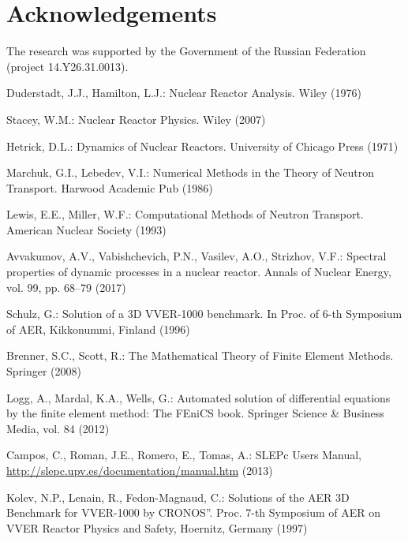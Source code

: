\documentclass[runningheads,a4paper]{llncs}
\begin{document}
\section{Acknowledgements}
The research was supported by the Government of the Russian Federation (project 14.Y26.31.0013).

\begin{thebibliography}{12}
Duderstadt, J.J., Hamilton, L.J.: Nuclear Reactor Analysis. Wiley (1976)

Stacey, W.M.: Nuclear Reactor Physics. Wiley (2007)

Hetrick, D.L.: Dynamics of Nuclear Reactors. University of Chicago Press (1971)

Marchuk, G.I., Lebedev, V.I.: Numerical Methods in the Theory of Neutron Transport. Harwood Academic Pub  (1986)

Lewis, E.E., Miller, W.F.: Computational Methods of Neutron Transport. American Nuclear Society (1993)

Avvakumov, A.V., Vabishchevich, P.N., Vasilev, A.O., Strizhov, V.F.: Spectral properties of dynamic processes in a nuclear reactor. Annals of Nuclear Energy, vol. 99, pp. 68--79 (2017)

Schulz, G.: Solution of a 3D VVER-1000 benchmark. In Proc. of 6-th Symposium of AER, Kikkonummi, Finland (1996)

Brenner, S.C., Scott, R.: The Mathematical Theory of Finite Element Methods. Springer (2008)

Logg, A., Mardal, K.A., Wells, G.: Automated solution of differential equations by the finite element method: The FEniCS book. Springer Science \& Business Media, vol. 84 (2012)

Campos, C., Roman, J.E., Romero, E., Tomas, A.: SLEPc Users Manual, \url{http://slepc.upv.es/documentation/manual.htm} (2013)

Kolev, N.P., Lenain, R., Fedon-Magnaud, C.: Solutions of the AER 3D Benchmark for VVER-1000 by CRONOS”. Proc. 7-th Symposium of AER on VVER Reactor Physics and Safety, Hoernitz, Germany (1997)
  
\end{thebibliography}
\end{document}

